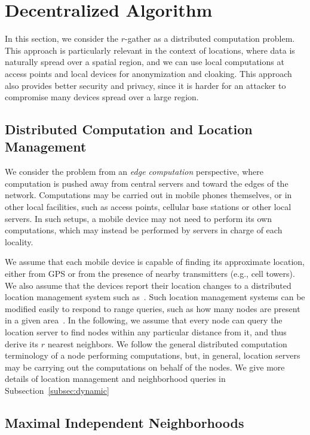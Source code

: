 
\section{Decentralized Algorithm}


In this section, we consider the $r$-gather as a distributed computation problem. This approach is particularly relevant in the context of locations, where data is naturally spread over a spatial region, and we can use local computations at access points and local devices for anonymization and cloaking. This approach also provides better security and privacy, since it is harder for an attacker to compromise many devices spread over a large region.

\subsection{Distributed Computation and Location Management}

We consider the problem from an {\em edge computation} perspective, where computation is pushed away from central servers and toward the edges of the network. Computations may be carried out in mobile phones themselves, or in other local facilities, such as access points, cellular base stations or other local servers. In such setups, a mobile device may not need to perform its own computations, which may instead be performed by servers in charge of each locality. 

We assume that each mobile device is capable of finding its approximate location, either from GPS or from the presence of nearby transmitters (e.g., cell towers). We also assume that the devices report their location changes to a distributed location management system such as~\cite{abraham04LLS}. Such location management systems can be modified easily to respond to range queries, such as how many nodes are present in a given area~\cite{Sarkar:2010:forms}. In the following, we assume that every node can query the location server to find nodes within any particular distance from it, and thus derive its $r$ nearest neighbors. We follow the general distributed computation terminology of a node performing computations, but,  in general, location servers may be carrying out the computations on behalf of the nodes. We give more details of location management and neighborhood queries in Subsection~\ref{subsec:dynamic}


\subsection{Maximal Independent Neighborhoods}

